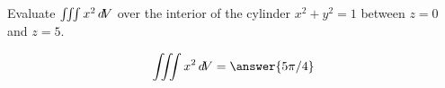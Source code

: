 \documentclass{ximera}
\author{David Guichard \and Neal Koblitz \and H. Jerome Keisler \and Albert Scheller \and Barry Balof \and Mike Wills \and Matthew Carr}
\begin{document}
\begin{exercise}




Evaluate $\iiint x^2 \mathop{}\!d\! V$ over the interior of the cylinder $x^2+y^2=1$ between $z=0$ and $z=5$.
\begin{prompt}
\[
\iiint x^2 \d V=\answer{5\pi/4}
\]
\end{prompt}



\end{exercise}
\end{document}
